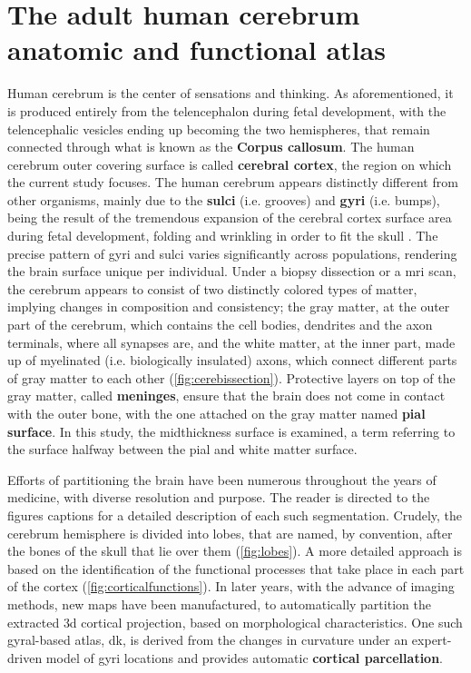 \section{The adult human cerebrum anatomic and functional atlas}
Human cerebrum is the center of sensations and thinking. As aforementioned, it is produced entirely from the telencephalon during fetal development, with the telencephalic vesicles ending up becoming the two hemispheres, that remain connected through what is known as the \textbf{Corpus callosum}. The human cerebrum outer covering surface is called \textbf{cerebral cortex}, the region on which the current study focuses. The human cerebrum appears distinctly different from other organisms, mainly due to the \textbf{sulci} (i.e. grooves) and \textbf{gyri} (i.e. bumps), being the result of the tremendous expansion of the cerebral cortex surface area during fetal development, folding and wrinkling in order to fit the skull \cite{F.Bear2016}. The precise pattern of gyri and sulci varies significantly across populations, rendering the brain surface unique per individual. Under a biopsy dissection or a \ac{mri} scan, the cerebrum appears to consist of two distinctly colored types of matter, implying changes in composition and consistency; the gray matter, at the outer part of the cerebrum, which  contains the cell bodies, dendrites and the axon terminals, where all synapses are, and the white matter, at the inner part, made up of myelinated (i.e. biologically insulated) axons, which connect different parts of gray matter to each other (\autoref{fig:cerebissection}). Protective layers on top of the gray matter, called \textbf{meninges}, ensure that the brain does not come in contact with the outer bone, with the one attached on the gray matter named \textbf{pial surface}. In this study, the midthickness surface is examined, a term referring to the surface halfway between the pial and white matter surface. 

Efforts of partitioning the brain have been numerous throughout the years of medicine, with diverse resolution and purpose. The reader is directed to the figures captions for a detailed description of each such segmentation. Crudely, the cerebrum hemisphere is divided into lobes, that are named, by convention, after the bones of the skull that lie over them (\autoref{fig:lobes}). A more detailed approach is based on the identification of the functional processes that take place in each part of the cortex (\autoref{fig:corticalfunctions}). In later years, with the advance of imaging methods, new maps have been manufactured, to automatically partition the extracted \ac{3d} cortical projection, based on morphological characteristics. One such gyral-based atlas, \ac{dk}, is derived from the changes in curvature under an expert-driven model of gyri locations \cite{Desikan2006} and provides automatic \textbf{cortical parcellation}. 

